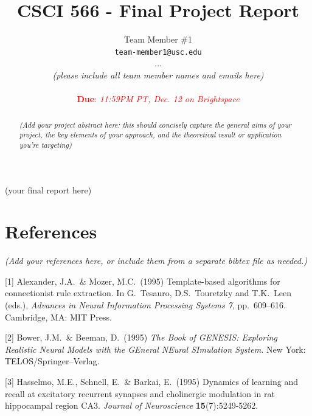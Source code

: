 \documentclass{article}
\title{CSCI 566 - Final Project Report}
\author{%
  Team Member \#1 \\
  \texttt{team-member1@usc.edu} \\
  $\dots$ \\
  \textit{(please include all team member names and emails here)}
  \\ \\
  \textcolor{red}{\textbf{Due}: \textit{11:59PM PT, Dec. 12 on Brightspace}}
}
\begin{document}
\maketitle

\begin{abstract}
\textit{(Add your project abstract here: this should concisely capture the general aims of your project, the key elements of your approach, and the theoretical result or application you're targeting)}
\end{abstract}

(your final report here) 

\section*{References}
\textit{(Add your references here, or include them from a separate bibtex file as needed.)}
\\

{
\small
[1] Alexander, J.A.\ \& Mozer, M.C.\ (1995) Template-based algorithms for
connectionist rule extraction. In G.\ Tesauro, D.S.\ Touretzky and T.K.\ Leen
(eds.), {\it Advances in Neural Information Processing Systems 7},
pp.\ 609--616. Cambridge, MA: MIT Press.

[2] Bower, J.M.\ \& Beeman, D.\ (1995) {\it The Book of GENESIS: Exploring
  Realistic Neural Models with the GEneral NEural SImulation System.}  New York:
TELOS/Springer--Verlag.

[3] Hasselmo, M.E., Schnell, E.\ \& Barkai, E.\ (1995) Dynamics of learning and
recall at excitatory recurrent synapses and cholinergic modulation in rat
hippocampal region CA3. {\it Journal of Neuroscience} {\bf 15}(7):5249-5262.
}
\end{document}
